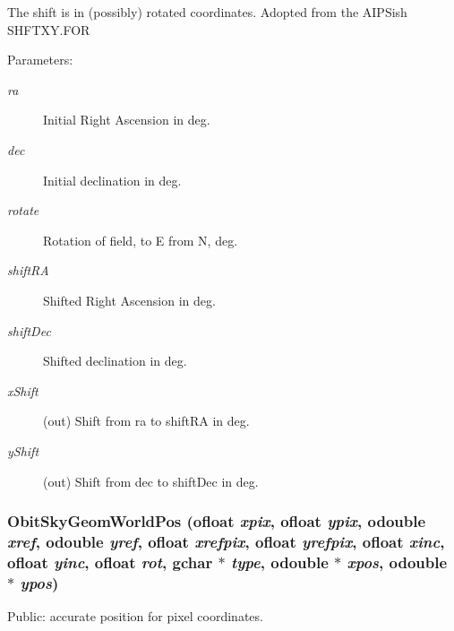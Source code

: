 The shift is in (possibly) rotated coordinates. Adopted from the AIPSish SHFTXY.FOR \begin{Desc}
\item[Parameters:]
\begin{description}
\item[{\em ra}]Initial Right Ascension in deg. \item[{\em dec}]Initial declination in deg. \item[{\em rotate}]Rotation of field, to E from N, deg. \item[{\em shift\-RA}]Shifted Right Ascension in deg. \item[{\em shift\-Dec}]Shifted declination in deg. \item[{\em x\-Shift}](out) Shift from ra to shift\-RA in deg. \item[{\em y\-Shift}](out) Shift from dec to shift\-Dec in deg. \end{description}
\end{Desc}
\subsubsection{ Obit\-Sky\-Geom\-World\-Pos ({\bf ofloat} {\em xpix}, {\bf ofloat} {\em ypix}, {\bf odouble} {\em xref}, {\bf odouble} {\em yref}, {\bf ofloat} {\em xrefpix}, {\bf ofloat} {\em yrefpix}, {\bf ofloat} {\em xinc}, {\bf ofloat} {\em yinc}, {\bf ofloat} {\em rot}, gchar $\ast$ {\em type}, {\bf odouble} $\ast$ {\em xpos}, {\bf odouble} $\ast$ {\em ypos})}\label{ObitSkyGeom_8c_a9}


Public: accurate position for pixel coordinates. 

